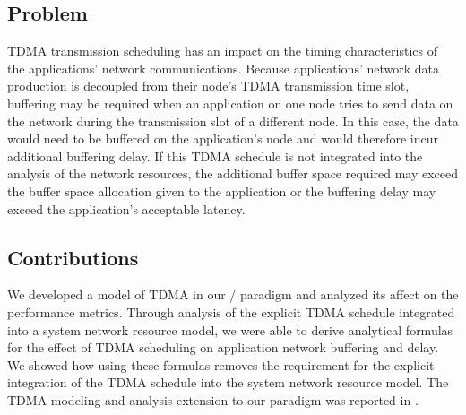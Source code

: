 \subsection{Problem}
TDMA transmission scheduling has an impact on the timing
characteristics of the applications' network communications.  Because
applications' network data production is decoupled from their node's
TDMA transmission time slot, buffering may be required when an
application on one node tries to send data on the network during the
transmission slot of a different node.  In this case, the data would
need to be buffered on the application's node and would therefore
incur additional buffering delay.  If this TDMA schedule is not
integrated into the analysis of the network resources, the additional
buffer space required may exceed the buffer space allocation given to
the application or the buffering delay may exceed the application's
acceptable latency.

\subsection{Contributions}

We developed a model of TDMA in our \shorttool/ paradigm and analyzed
its affect on the performance metrics.  Through analysis of the
explicit TDMA schedule integrated into a system network resource
model, we were able to derive analytical formulas for the effect of
TDMA scheduling on application network buffering and delay.  We showed
how using these formulas removes the requirement for the explicit
integration of the TDMA schedule into the system network resource
model.  The TDMA modeling and analysis extension to our paradigm was
reported in \cite{ISIS_F6_ISORC_QOS:15}.

\newpage

